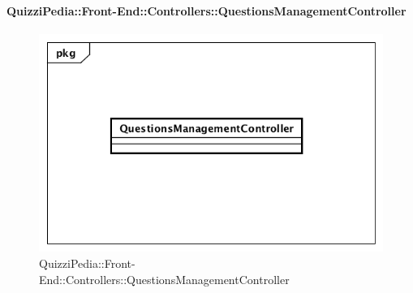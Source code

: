\paragraph{QuizziPedia::Front-End::Controllers::QuestionsManagementController}
\begin{figure} [ht]
	\centering
	\includegraphics[scale=0.45]{UML/Classi/Front-End/QuizziPedia_Front-end_Controller_QuestionsManagementController.png}
	\caption{QuizziPedia::Front-End::Controllers::QuestionsManagementController}
\end{figure} \FloatBarrier
